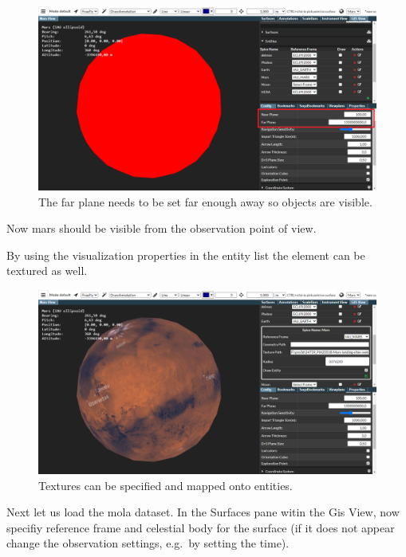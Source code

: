 \begin{figure}[h!]
	\centering
	\includegraphics[width=1\textwidth]{./pics/farplane.png}
	\caption{The far plane needs to be set far enough away so objects are visible.}
\end{figure}

Now mars should be visible from the observation point of view.

By using the visualization properties in the entity list the element can
be textured as well.

\begin{figure}[h!]
	\centering
	\includegraphics[width=1\textwidth]{./pics/textured.png}
	\caption{Textures can be specified and mapped onto entities.}
\end{figure}

Next let us load the mola dataset. In the Surfaces pane witin the Gis
View, now specifiy reference frame and celestial body for the surface
(if it does not appear change the observation settings, e.g.~by setting
the time).

